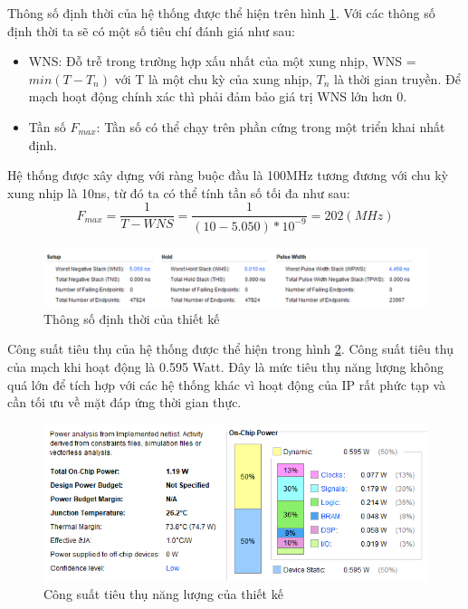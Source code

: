 Thông số định thời của hệ thống được thể hiện trên hình \ref{fig:ipTiming}. Với các thông số định thời ta sẽ có một số tiêu chí đánh giá như sau:
\begin{itemize}
	\item WNS: Đỗ trễ trong trường hợp xấu nhất của một xung nhịp, WNS = $min(T-T_n)$ với T là một chu kỳ của xung nhịp, $T_n$ là thời gian truyền. Để mạch hoạt động chính xác thì phải đảm bảo giá trị WNS lớn hơn 0.
	\item Tần số $F_{max}$: Tần số có thể chạy trên phần cứng trong một triển khai nhất định.
\end{itemize}
Hệ thống được xây dựng với ràng buộc đầu là 100MHz tương đương với chu kỳ xung nhịp là 10ns, từ đó ta có thể tính tần số tối đa như sau:
\begin{equation*}
	F_{max} = \frac{1}{T - WNS} = \frac{1}{(10 - 5.050)*10^{-9}} = 202   (MHz) 
\end{equation*}

\begin{figure}[!ht]
	\centering
	\includegraphics[width=\linewidth]{figures/ipTiming.png}
	\caption{Thông số định thời của thiết kế}
	\label{fig:ipTiming}
\end{figure}


Công suất tiêu thụ của hệ thống được thể hiện trong hình \ref{fig:power}. Công suất tiêu thụ của mạch khi hoạt động là 0.595 Watt. Đây là mức tiêu thụ năng lượng không quá lớn để tích hợp với các hệ thống khác vì hoạt động của IP rất phức tạp và cần tối ưu về mặt đáp ứng thời gian thực.

\begin{figure}[!ht]
	\centering
	\includegraphics[width=\linewidth]{figures/power.png}
	\caption{Công suất tiêu thụ năng lượng của thiết kế}
	\label{fig:power}
\end{figure}

